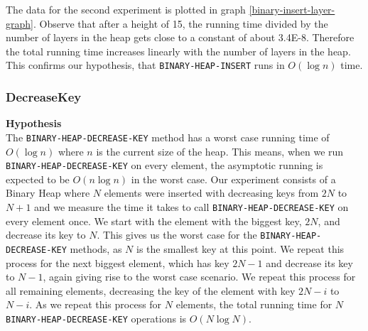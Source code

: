 \documentclass[a4paper,10pt]{article}
\begin{document}
The data for the second experiment is plotted in graph \ref{binary-insert-layer-graph}. Observe that after a height of 15, the running time divided by the number of layers in the heap gets close to a constant of about 3.4E-8. Therefore the total running time increases linearly with the number of layers in the heap. This confirms our hypothesis, that \texttt{BINARY\--HEAP\--INSERT} runs in $O(\log n)$ time.

\subsubsection{DecreaseKey}
{\bf Hypothesis}\\
The \texttt{BINARY\--HEAP\--DECREASE\--KEY} method has a worst case running time of $O(\log n)$ where $n$ is the current size of the heap. This means, when we run \texttt{BINARY\--HEAP\--DECREASE\--KEY} on every element, the asymptotic running is expected to be $O(n\log n)$ in the worst case. Our experiment consists of a Binary Heap where $N$ elements were inserted with decreasing keys from $2N$ to $N+1$ and we measure the time it takes to call \texttt{BINARY\--HEAP\--DECREASE\--KEY} on every element once. We start with the element with the biggest key, $2N$, and decrease its key to $N$. This gives us the worst case for the \texttt{BINARY\--HEAP\--DECREASE\--KEY} methods, as $N$ is the smallest key at this point. We repeat this process for the next biggest element, which has key $2N-1$ and decrease its key to $N-1$, again giving rise to the worst case scenario. We repeat this process for all remaining elements, decreasing the key of the element with key $2N-i$ to $N-i$. As we repeat this process for $N$ elements, the total running time for $N$ \texttt{BINARY\--HEAP\--DECREASE\--KEY} operations is $O(N\log N)$.
\end{document}
